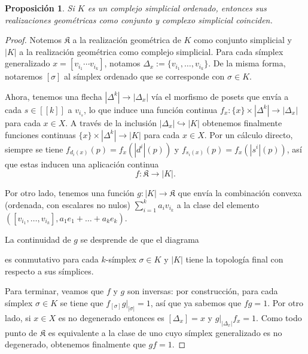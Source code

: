 \documentclass[11pt]{report}
\theoremstyle{colored}
\newtheorem{proposition}{Proposición}[section]
\newcommand{\nat}[1]{[\![#1]\!]}
\newcommand{\ord}[1]{\nat{#1}}
\renewcommand{\ss}[1]{\Delta^{#1}}
\begin{document}
\begin{proposition} Si $K$ es un complejo simplicial ordenado, entonces sus realizaciones geométricas como conjunto y complexo simplicial coinciden.
\end{proposition}
\begin{proof} Notemos $\mathfrak{K}$ a la realización geométrica de $K$ como conjunto simplicial y $|K|$ a la realización geométrica como complejo simplicial. Para cada símplex generalizado $x  = [v_{i_1}\cdots v_{i_k}]$, notamos $\Delta_x := \{v_{i_1}, \dots, v_{i_k}\}$. De la misma forma, notaremos $[\sigma]$ al símplex ordenado que se corresponde con $\sigma \in K$.

Ahora, tenemos una flecha $|\ss{k}| \to |\Delta_x|$ vía el morfismo de posets que envía a cada $s \in \ord{k}$ a $v_{i_s}$, lo que induce una función continua  $f_x : \{x\} \times |\Delta^k| \to |\Delta_x|$ para cada $x\in X$. A través de la inclusión $|\Delta_x| \hookrightarrow |K|$ obtenemos finalmente funciones continuas $ \{x\} \times |\ss{k}| \to |K|$ para cada $x \in X$. Por un cálculo directo, siempre se tiene $f_{d_i(x)}(p)  = f_x(|d^i|(p))$ y $f_{s_i(x)}(p) = f_x(|s^i|(p))$, así que estas inducen una aplicación continua
\[
f: \mathfrak{K} \to |K|.
\]

Por otro lado, tenemos una función $g : |K| \to \mathfrak{K}$ que envía la combinación convexa (ordenada, con escalares no nulos) $\sum_{i=1}^k a_iv_{i_k}$ a la clase del elemento $([v_{i_1}, \dots, v_{i_k}] ,a_1e_1 + \dots + a_ke_k)$.

La continuidad de $g$ se desprende de que el diagrama
\begin{center}
\end{center}
es conmutativo para cada $k$-símplex $\sigma \in K$ y $|K|$ tiene la topología final con respecto a sus símplices. 

Para terminar, veamos que $f$ y $g$ son inversas: por construcción, para cada símplex $\sigma \in K$ se tiene que $f_{[\sigma]}g|_{|\sigma|} = 1$, así que ya sabemos que $fg = 1$. Por otro lado, si $x \in X$ es no degenerado entonces es $[\Delta_x] = x$ y  $g|_{|\Delta_x|}f_x = 1$. Como todo punto de $\mathfrak{K}$ es equivalente a la clase de uno cuyo símplex generalizado es no degenerado, obtenemos finalmente que $gf = 1$.
\end{proof}
\end{document}
